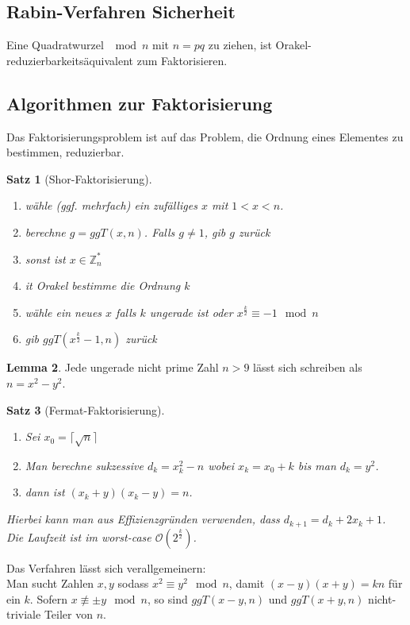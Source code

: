 \documentclass[a4paper, 12pt]{article}
\theoremstyle{plain}
\newtheorem{theorem}{Satz}[subsection] %
\theoremstyle{definition}
\theoremstyle{lemma}
\newtheorem{lemma}[theorem]{Lemma}
\theoremstyle{remark}
\theoremstyle{corollary}
\theoremstyle{example}
\begin{document}
	\subsection{Rabin-Verfahren Sicherheit}
	Eine Quadratwurzel $\mod n$ mit $n = pq$ zu ziehen, ist Orakel-reduzierbarkeitsäquivalent zum Faktorisieren.
	\subsection{Algorithmen zur Faktorisierung}
	Das Faktorisierungsproblem ist auf das Problem, die Ordnung eines Elementes zu bestimmen, reduzierbar.
	\begin{theorem}[Shor-Faktorisierung]
		\begin{enumerate}
			\item wähle (ggf. mehrfach) ein zufälliges $x$ mit $1<x<n$.
			\item berechne $g=ggT(x,n)$. Falls $g\neq 1$, gib $g$ zurück
			\item sonst ist $x \in \mathbb{Z}_n^*$
			\item it Orakel bestimme die Ordnung $k$
			\item wähle ein neues $x$ falls $k$ ungerade ist oder $x^{\frac{k}{2}} \equiv -1 \mod n$
			\item gib $ggT(x^{\frac{k}{2}}-1,n)$ zurück
		\end{enumerate}
	\end{theorem}
	\begin{lemma}
		Jede ungerade nicht prime Zahl $n>9$ lässt sich schreiben als $n = x^2-y^2$. 
	\end{lemma}
	\begin{theorem}[Fermat-Faktorisierung]
		\begin{enumerate}
			\item Sei $x_0 = \lceil\sqrt{n}\rceil$
			\item Man berechne sukzessive $d_k = x_k^2 - n$ wobei $x_k = x_0 + k$ bis man $d_k = y^2$.
			\item dann ist $(x_k+y)(x_k-y) = n$.
		\end{enumerate}
		Hierbei kann man aus Effizienzgründen verwenden, dass $d_{k+1} = d_k + 2x_k+1$. Die Laufzeit ist im worst-case $\mathcal{O}(2^{\frac{k}{2}})$.
	\end{theorem}
	Das Verfahren lässt sich verallgemeinern:\\
	Man sucht Zahlen $x,y$ sodass $x^2 \equiv y^2 \mod n$, damit $(x-y)(x+y) = kn$ für ein $k$. Sofern $x \not \equiv \pm y \mod n$, so sind $ggT(x-y,n)$ und $ggT(x+y,n)$ nicht-triviale Teiler von $n$.
\end{document}
